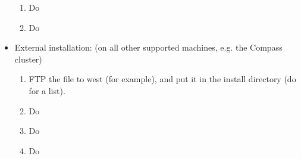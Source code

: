 \begin{itemize}
\begin{enumerate}
   \item Do 
   \item Do 

\end{enumerate}

\item External installation: (on all other supported machines,
e.g. the Compass cluster)
\begin{enumerate}

   \item FTP the file  to west (for example), and put it
   in the install directory (do  for a list).
   \item Do 
   \item Do 
   \item Do 

\end{enumerate}

\end{itemize}

